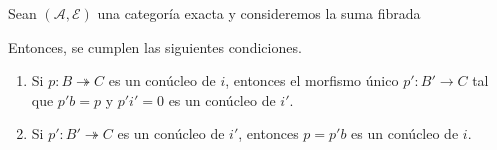 \documentclass[tesis]{subfiles}
\begin{document}
\begin{Lema}\label{Bühler-2.13}
    Sean $(\mathscr{A},\mathscr{E})$ una categoría exacta y consideremos la suma fibrada
    \begin{center}
    \end{center}
    Entonces, se cumplen las siguientes condiciones.

    \begin{enumerate}[label=(\alph*)]
    
        \item Si $p:B\twoheadrightarrow C$ es un conúcleo de $i$, entonces el morfismo único $p':B'\to C$ tal que $p'b=p$ y $p'i'=0$ es un conúcleo de $i'$.

        \item Si $p':B'\twoheadrightarrow C$ es un conúcleo de $i'$, entonces $p=p'b$ es un conúcleo de $i$.
    \end{enumerate}
\end{Lema}
\end{document}
